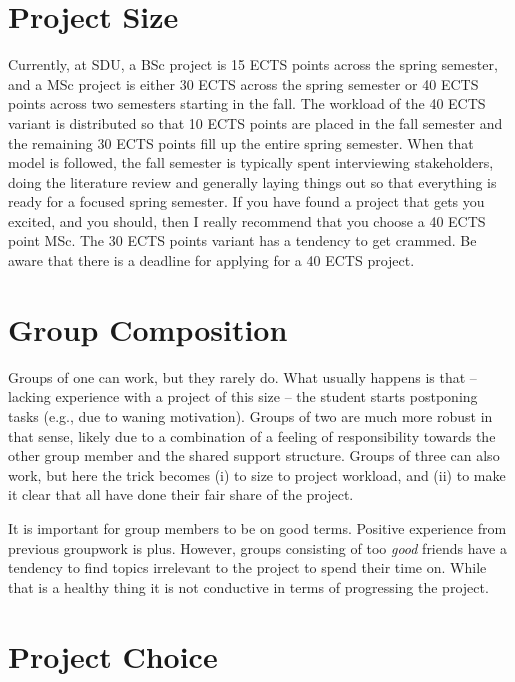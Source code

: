 \documentclass[a4paper]{memoir}
\begin{document}
\section{Project Size}
\label{sec:projectsize}

Currently, at SDU, a BSc project is 15 ECTS points across the spring semester, and a MSc project is either 30 ECTS across the spring semester or 40 ECTS points across two semesters starting in the fall. The workload of the 40 ECTS variant is distributed so that 10 ECTS points are placed in the fall semester and the remaining 30 ECTS points fill up the entire spring semester. When that model is followed, the fall semester is typically spent interviewing stakeholders, doing the literature review and generally laying things out so that everything is ready for a focused spring semester. If you have found a project that gets you excited, and you should, then I really recommend that you choose a 40 ECTS point MSc. The 30 ECTS points variant has a tendency to get crammed. Be aware that there is a deadline for applying for a 40 ECTS project.

\section{Group Composition}

Groups of one can work, but they rarely do. What usually happens is that -- lacking experience with a project of this size -- the student starts postponing tasks (e.g., due to waning motivation). Groups of two are much more robust in that sense, likely due to a combination of a feeling of responsibility towards the other group member and the shared support structure. Groups of three can also work, but here the trick becomes (i) to size to project workload, and (ii) to make it clear that all have done their fair share of the project.

It is important for group members to be on good terms. Positive experience from previous groupwork is  plus. However, groups consisting of too \textsl{good} friends have a tendency to find topics irrelevant to the project to spend their time on. While that is a healthy thing it is not conductive in terms of progressing the project.

\section{Project Choice}
\end{document}
